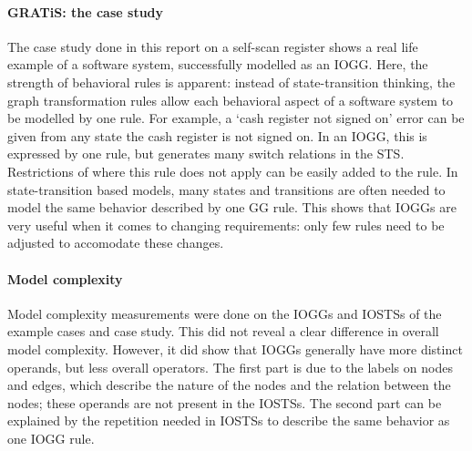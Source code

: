 \paragraph*{GRATiS: the case study}
The case study done in this report on a self-scan register shows a real life example of a software system, successfully modelled as an IOGG. Here, the strength of behavioral rules is apparent: instead of state-transition thinking, the graph transformation rules allow each behavioral aspect of a software system to be modelled by one rule. For example, a `cash register not signed on' error can be given from any state the cash register is not signed on. In an IOGG, this is expressed by one rule, but generates many switch relations in the STS. Restrictions of where this rule does not apply can be easily added to the rule. In state-transition based models, many states and transitions are often needed to model the same behavior described by one GG rule. This shows that IOGGs are very useful when it comes to changing requirements: only few rules need to be adjusted to accomodate these changes.

\paragraph*{Model complexity}
Model complexity measurements were done on the IOGGs and IOSTSs of the example cases and case study. This did not reveal a clear difference in overall model complexity. However, it did show that IOGGs generally have more distinct operands, but less overall operators. The first part is due to the labels on nodes and edges, which describe the nature of the nodes and the relation between the nodes; these operands are not present in the IOSTSs. The second part can be explained by the repetition needed in IOSTSs to describe the same behavior as one IOGG rule.
